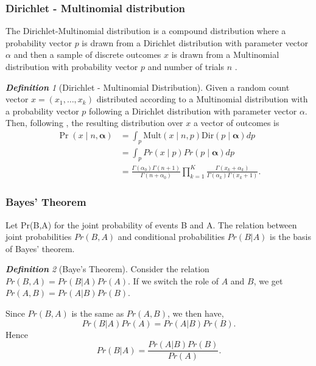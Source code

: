 \documentclass[12pt,oneside,a4paper]{book}
\theoremstyle{definition}
\theoremstyle{remark}
\newtheorem{defn}{\bf Definition}[subsection]
\begin{document}
				\subsubsection{Dirichlet - Multinomial distribution}
					The Dirichlet-Multinomial distribution is a compound distribution where a probability vector $p$ is drawn from a Dirichlet distribution with parameter vector $\alpha$ and then a sample of discrete outcomes $x$ is drawn from a Multinomial distribution with probability vector $p$ and number of trials $n$ \cite{Minka2012EstimatingAD}.
					\begin{defn}[Dirichlet - Multinomial Distribution]
						Given a random count vector $x=(x_1, \ldots, x_k)$ distributed according to a Multinomial distribution with a probability vector $p$ following a Dirichlet distribution with parameter vector $\alpha$. Then, following  \cite{Minka2012EstimatingAD}, the resulting distribution over $x$ a vector of outcomes is
						\begin{equation}
						 \begin{aligned}
						 	\Pr({x} \mid n,{\boldsymbol {\alpha }}) &=
								 	\int _{p }
									 	\mathrm {Mult} (x \mid n,p )
									 	\mathrm {Dir} (p \mid {\boldsymbol {\alpha }})dp\\
									 								&=
									 \int _{p }
									 	Pr(x \mid p)Pr(p \mid \boldsymbol{\alpha}) dp\\
									 								&=
									 {\frac {\Gamma \left(\alpha _{0}\right)\Gamma \left(n+1\right)}{\Gamma \left(n+\alpha _{0}\right)}}\prod _{k=1}^{K}{\frac {\Gamma (x_{k}+\alpha _{k})}{\Gamma (\alpha _{k})\Gamma \left(x_{k}+1\right)}}.
						 \end{aligned}
						\end{equation}
					\end{defn}

				\subsubsection{Bayes' Theorem}
				Let Pr(B,A) for the joint probability of events B and A.
				The relation between joint probabilities $Pr(B,A)$ and conditional probabilities $Pr(B|A)$ is the basis of Bayes’ theorem.
				\begin{defn}[Baye's Theorem]\label{dfn:bayestheorem}
					Consider the relation $ Pr(B,A) = Pr(B|A)Pr(A)$. If we switch the role of $A$ and $B$, we get $Pr(A,B) = Pr(A|B)Pr(B)$.

					Since $Pr(B,A)$ is the same as $Pr(A,B)$, we then have,
					\[
						Pr(B|A)Pr(A) = Pr(A|B)Pr(B).
					\]
					Hence
					\begin{equation}\label{eqn:baye_1}
						Pr(B|A) = \frac{Pr(A|B)Pr(B)}{Pr(A)}.
					\end{equation}
				\end{defn}
\end{document}
